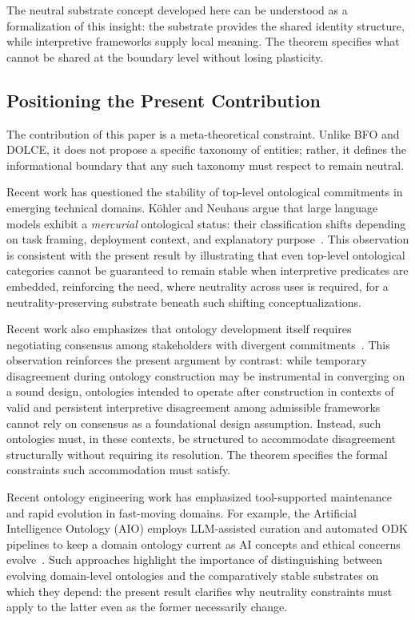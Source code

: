 The neutral substrate concept developed here
can be understood as a formalization of this insight:
the substrate provides the shared identity structure,
while interpretive frameworks supply local meaning.
The theorem specifies what cannot be shared
at the boundary level without losing plasticity.

\subsection{Positioning the Present Contribution}

The contribution of this paper is a meta-theoretical constraint.
Unlike BFO and DOLCE, it does not propose a specific taxonomy of entities;
rather, it defines the informational boundary
that any such taxonomy must respect to remain neutral.

Recent work has questioned the stability of top-level ontological
commitments in emerging technical domains.
Köhler and Neuhaus argue that large language models
exhibit a \textit{mercurial} ontological status:
their classification shifts depending on task framing,
deployment context,
and explanatory purpose~\citep{kohler2025mercurial}.
This observation is consistent with the present result by illustrating
that even top-level ontological categories
cannot be guaranteed to remain stable
when interpretive predicates are embedded,
reinforcing the need, where neutrality across uses is required,
for a neutrality-preserving substrate
beneath such shifting conceptualizations.

Recent work also emphasizes that ontology development itself
requires negotiating consensus among stakeholders
with divergent commitments~\citep{neuhaus2022consensus}.
This observation reinforces the present argument by contrast:
while temporary disagreement during ontology construction
may be instrumental in converging on a sound design,
ontologies intended to operate after construction
in contexts of valid and persistent interpretive disagreement
among admissible frameworks
cannot rely on consensus as a foundational design assumption.
Instead, such ontologies must, in these contexts, be structured to
accommodate disagreement structurally without requiring its resolution.
The theorem specifies
the formal constraints such accommodation must satisfy.

Recent ontology engineering work has emphasized
tool-supported maintenance and rapid evolution in fast-moving domains.
For example, the Artificial Intelligence Ontology (AIO) employs
LLM-assisted curation and automated ODK pipelines
to keep a domain ontology current
as AI concepts and ethical concerns evolve~\citep{joachimiak2025aio}.
Such approaches highlight the importance of distinguishing
between evolving domain-level ontologies
and the comparatively stable substrates on which they depend:
the present result clarifies why neutrality constraints must apply
to the latter even as the former necessarily change.

